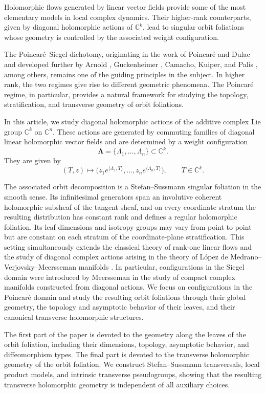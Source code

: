 \documentclass[11pt]{amsart}
\theoremstyle{definition}
\theoremstyle{remark}
\newcommand{\C}{\mathbb{C}}
\newcommand{\Lam}{\pmb{\Lambda}}
\begin{document}
Holomorphic flows generated by linear vector fields provide some of the most elementary models in local complex dynamics.
Their higher-rank counterparts, given by diagonal holomorphic actions of $\C^k$, lead to singular orbit foliations whose geometry is controlled by the associated weight configuration.

The Poincaré--Siegel dichotomy, originating in the work of Poincaré and Dulac and developed further by Arnold \cite{Arnold}, Guckenheimer \cite{Gu}, Camacho, Kuiper, and Palis \cite{CKP}, among others, remains one of the guiding principles in the subject.
In higher rank, the two regimes give rise to different geometric phenomena.
The Poincaré regime, in particular, provides a natural framework for studying the topology, stratification, and transverse geometry of orbit foliations.

In this article, we study diagonal holomorphic actions of the additive complex Lie group $\C^k$ on $\C^n$.
These actions are generated by commuting families of diagonal linear holomorphic vector fields and are determined by a weight configuration
\[
	\Lam=\{\Lambda_1,\dots,\Lambda_n\}\subset\C^k.
\]
They are given by
\[
	(T,z)\longmapsto
	\bigl(
	z_1e^{\langle\Lambda_1,T\rangle},
	\dots,
	z_ne^{\langle\Lambda_n,T\rangle}
	\bigr),
	\qquad T\in\C^k.
\]

The associated orbit decomposition is a Stefan--Sussmann singular foliation in the smooth sense.
Its infinitesimal generators span an involutive coherent holomorphic subsheaf of the tangent sheaf, and on every coordinate stratum the resulting distribution has constant rank and defines a regular holomorphic foliation.
Its leaf dimensions and isotropy groups may vary from point to point but are constant on each stratum of the coordinate-plane stratification.
This setting simultaneously extends the classical theory of rank-one linear flows and the study of diagonal complex actions arising in the theory of L\'opez de Medrano--Verjovsky--Meersseman manifolds \cite{LdM-V, Meersseman, Verjovsky, Santiago2}.
In particular, configurations in the Siegel domain were introduced by Meersseman in the study of compact complex manifolds constructed from diagonal actions.
We focus on configurations in the Poincaré domain and study the resulting orbit foliations through their global geometry, the topology and asymptotic behavior of their leaves, and their canonical transverse holomorphic structures.

The first part of the paper is devoted to the geometry along the leaves of the orbit foliation, including their dimensions, topology, asymptotic behavior, and diffeomorphism types.
The final part is devoted to the transverse holomorphic geometry of the orbit foliation.
We construct Stefan--Sussmann transversals, local product models, and intrinsic transverse pseudogroups, showing that the resulting transverse holomorphic geometry is independent of all auxiliary choices.
\end{document}

